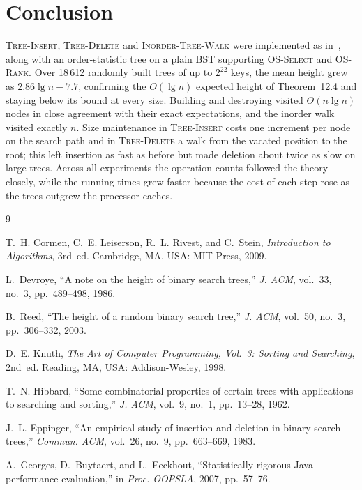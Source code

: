 \documentclass[conference]{IEEEtran}
\newcommand{\INS}{\textsc{Tree-Insert}}
\newcommand{\DEL}{\textsc{Tree-Delete}}
\newcommand{\WALK}{\textsc{Inorder-Tree-Walk}}
\newcommand{\SEL}{\textsc{OS-Select}}
\newcommand{\RANK}{\textsc{OS-Rank}}
\begin{document}
\section{Conclusion}

\INS{}, \DEL{} and \WALK{} were implemented as in~\cite{clrs}, along with an
order-statistic tree on a plain BST supporting \SEL{} and \RANK{}. Over
18\,612 randomly built trees of up to $2^{22}$ keys, the mean height grew as
$2.86\lg n - 7.7$, confirming the $O(\lg n)$ expected height of Theorem~12.4
and staying below its bound at every size. Building and destroying visited
$\Theta(n\lg n)$ nodes in close agreement with their exact expectations, and
the inorder walk visited exactly $n$. Size maintenance in \INS{} costs one
increment per node on the search path and in \DEL{} a walk from the vacated
position to the root; this left insertion as fast as before but made deletion
about twice as slow on large trees. Across all experiments the operation
counts followed the theory closely, while the running times grew faster
because the cost of each step rose as the trees outgrew the processor caches.

\begin{thebibliography}{9}

T.~H. Cormen, C.~E. Leiserson, R.~L. Rivest, and C.~Stein, \textit{Introduction
to Algorithms}, 3rd~ed. Cambridge, MA, USA: MIT Press, 2009.

L.~Devroye, ``A note on the height of binary search trees,''
\textit{J. ACM}, vol.~33, no.~3, pp.~489--498, 1986.

B.~Reed, ``The height of a random binary search tree,'' \textit{J. ACM},
vol.~50, no.~3, pp.~306--332, 2003.

D.~E. Knuth, \textit{The Art of Computer Programming, Vol.~3: Sorting and
Searching}, 2nd~ed. Reading, MA, USA: Addison-Wesley, 1998.

T.~N. Hibbard, ``Some combinatorial properties of certain trees with
applications to searching and sorting,'' \textit{J. ACM}, vol.~9, no.~1,
pp.~13--28, 1962.

J.~L. Eppinger, ``An empirical study of insertion and deletion in binary
search trees,'' \textit{Commun. ACM}, vol.~26, no.~9, pp.~663--669, 1983.

A.~Georges, D.~Buytaert, and L.~Eeckhout, ``Statistically rigorous Java
performance evaluation,'' in \textit{Proc. OOPSLA}, 2007, pp.~57--76.

\end{thebibliography}
\end{document}
